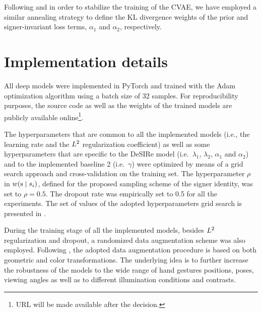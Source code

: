Following \citet{Bowman2015} and in order to stabilize the training of the CVAE, we have employed a similar annealing strategy to define the KL divergence weights of the prior and signer-invariant loss terms, $\alpha_1$ and $\alpha_2$, respectively.

\section{Implementation details}
\label{sec:desire_imp_details}
All deep models were implemented in PyTorch and trained with the Adam optimization algorithm using a batch size of 32 samples. For reproducibility purposes, the source code as well as the weights of the trained models are publicly available online\footnote{URL will be made available after the decision.}.

The hyperparameters that are common to all the implemented models (i.e., the learning rate and the $L^2$ regularization coefficient) as well as some hyperparameters that are specific to the DeSIRe model (i.e.\ $\lambda_{1}$, $\lambda_{2}$, $\alpha_{1}$ and $\alpha_{2}$) and to the implemented baseline 2 (i.e.\ $\gamma$) were optimized by means of a grid search approach and cross-validation on the training set. The hyperparameter $\rho$ in $w({\textnormal{s}} \mid s_{i})$, defined for the proposed sampling scheme of the signer identity, was set to $\rho=0.5$. The dropout rate was empirically set to 0.5 for all the experiments. The set of values of the adopted hyperparameters grid search is presented in .

During the training stage of all the implemented models, besides $L^2$ regularization and dropout, a randomized data augmentation scheme was also employed. Following \citet{Ferreira2018}, the adopted data augmentation procedure is based on both geometric and color transformations. The underlying idea is to further increase the robustness of the models to the wide range of hand gestures positions, poses, viewing angles as well as to different illumination conditions and contrasts.

